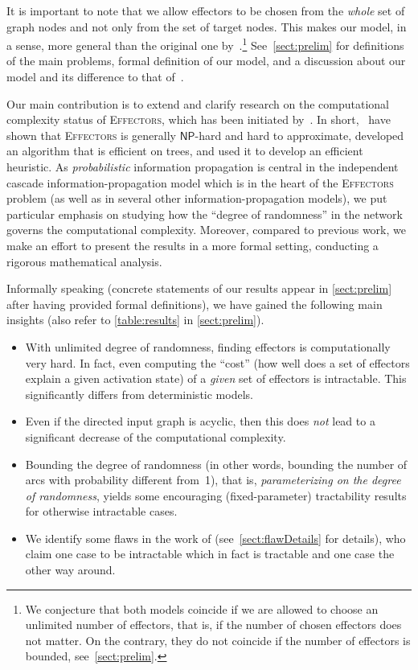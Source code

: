 \documentclass{article}
\newcommand{\np}{{\mathsf{NP}}}
\newcommand{\probEffectors}{\textsc{Effectors}\xspace}
\begin{document}
It is important to note that we allow effectors to be chosen from
the \emph{whole} set of graph nodes and not only from the set of target nodes.
This makes our model, in a sense, more general than the original one by~\citet{LTGMH10}.\footnote{We
conjecture that both models coincide if we are allowed to choose an unlimited number of effectors,
that is,
if the number of chosen effectors does not matter.
On the contrary, they do not coincide if the number of effectors is bounded,
see~\autoref{sect:prelim}.}
See~\autoref{sect:prelim} for definitions of the main problems,
formal definition of our model, and a discussion about our model and its difference to that of~\citet{LTGMH10}.


Our main contribution is to extend and clarify research 
on the computational complexity status of \probEffectors, which has 
been initiated by~\citet{LTGMH10}.
In short,~\citet{LTGMH10} have shown that \probEffectors is generally $\np$-hard and hard to approximate,
developed an algorithm that is efficient on trees,
and used it to develop an efficient heuristic.
As \emph{probabilistic} information propagation is central in the independent cascade information-propagation model
which is in the heart of the \probEffectors problem (as well as in several other information-propagation models),
we put particular emphasis on studying how the ``degree of randomness''
in the network governs the computational complexity.
Moreover, compared to previous work, we make an effort to present
the results in a more formal setting, conducting a rigorous mathematical analysis.


Informally speaking (concrete statements of our results appear 
in \autoref{sect:prelim} after having provided formal definitions), 
we have gained the following main insights (also refer to \autoref{table:results} in
\autoref{sect:prelim}).
\begin{itemize}
  \item With unlimited degree of randomness, finding effectors is 
  computationally very hard. In fact, even computing the ``cost'' (how well 
  does a set of effectors explain a given activation state) of a \emph{given}
  set of effectors is intractable.
  This significantly differs from
  deterministic models.
  \item Even if the directed input graph is acyclic, then this does \emph{not}
  lead to a significant decrease of the computational complexity. 
  \item Bounding the degree of randomness (in other words, bounding the number 
  of arcs with probability different from~1), that is,
  \emph{parameterizing on the degree of randomness}, yields some 
  encouraging (fixed-parameter) tractability 
  results for otherwise intractable cases.
  \item We identify some flaws in the work of \citet{LTGMH10}
  (see~\autoref{sect:flawDetails} for details),
  who claim one case to be intractable which in fact is tractable and one case the other
  way around.
\end{itemize}
\end{document}

